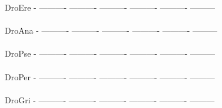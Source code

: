 \documentclass[11pt,twoside,reqno,a4paper]{article}
\begin{document}
{DroEre	-	----------	----------	----------	----------	----------	---------\\
\hspace*{7\charwidth}\hspace*{1\charwidth}\hspace*{1\charwidth}\hspace*{1\charwidth}\hspace*{1\charwidth}\hspace*{1\charwidth}\hspace*{1\charwidth}\\
DroAna	-	----------	----------	----------	----------	----------	---------\\
\hspace*{7\charwidth}\hspace*{1\charwidth}\hspace*{1\charwidth}\hspace*{1\charwidth}\hspace*{1\charwidth}\hspace*{1\charwidth}\hspace*{1\charwidth}\\
DroPse	-	----------	----------	----------	----------	----------	---------\\
\hspace*{7\charwidth}\hspace*{1\charwidth}\hspace*{1\charwidth}\hspace*{1\charwidth}\hspace*{1\charwidth}\hspace*{1\charwidth}\hspace*{1\charwidth}\\
DroPer	-	----------	----------	----------	----------	----------	---------\\
\hspace*{7\charwidth}\hspace*{1\charwidth}\hspace*{1\charwidth}\hspace*{1\charwidth}\hspace*{1\charwidth}\hspace*{1\charwidth}\hspace*{1\charwidth}\\
DroGri	-	----------	----------	----------	----------	----------	---------\\
\hspace*{7\charwidth}\hspace*{1\charwidth}\hspace*{1\charwidth}\hspace*{1\charwidth}\hspace*{1\charwidth}\hspace*{1\charwidth}\hspace*{1\charwidth}\\
}
\end{document}

